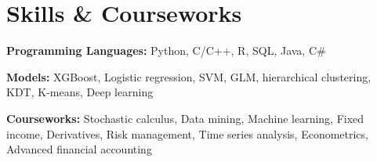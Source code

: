 \documentclass[a4paper,11pt]{article}
\newcommand{\resumeSubHeadingListStart}{\begin{itemize}[leftmargin=0.15in, label={}]}
\newcommand{\resumeSubHeadingListEnd}{\end{itemize}}
\begin{document}
\section{Skills \& Courseworks}
  \vspace{2pt}
  \resumeSubHeadingListStart
    \small{\item{
        \textbf{Programming Languages:}{ Python, C/C++, R, SQL, Java, C\#} \\ \vspace{3pt}
        
        \textbf{Models:}{ XGBoost, Logistic regression, SVM, GLM, hierarchical clustering, KDT, K-means, Deep learning} \\ \vspace{3pt}

        \textbf{Courseworks:}{ Stochastic calculus, Data mining, Machine learning, Fixed income, Derivatives, Risk management, Time series analysis, Econometrics, Advanced financial accounting} \\ \vspace{3pt}
        
        
    }}
  \resumeSubHeadingListEnd
\end{document}
